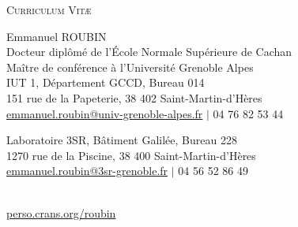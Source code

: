 \documentclass[a4paper,11pt]{article}
\begin{document}
\begin{center} \par\textsc{\huge Curriculum Vit\ae} \end{center}
\begin{minipage}{0.7\linewidth}
  \begin{flushleft}
    \LARGE Emmanuel ROUBIN \normalsize  \vspace{0.1cm} \\
    \large Docteur diplômé de l'École Normale Supérieure de Cachan\\
    \large Maître de conférence à l'Université Grenoble Alpes \normalsize\\\vspace{0.2cm}
    IUT 1, Département GCCD, Bureau 014\\
    151 rue de la Papeterie, 38 402 Saint-Martin-d'Hères\\
    \href{mailto:emmanuel.roubin@univ-grenoble-alpes.fr}{emmanuel.roubin@univ-grenoble-alpes.fr} $|$ 04 76 82 53 44 \\\vspace{0.2cm}

    Laboratoire 3SR, Bâtiment Galilée, Bureau 228\\
    1270 rue de la Piscine, 38 400 Saint-Martin-d'Hères\\
     \href{mailto:emmanuel.roubin@3sr-grenoble.fr}{emmanuel.roubin@3sr-grenoble.fr} $|$ 04 56 52 86 49\\
    
  \end{flushleft}
\end{minipage}
\hfill
\begin{minipage}{4cm}
  \centering
   \\ \vspace{0.1cm}
  \footnotesize\href{http://perso.crans.org/roubin}{perso.crans.org/roubin}
\end{minipage}
\vspace{0.5cm}
\end{document}
